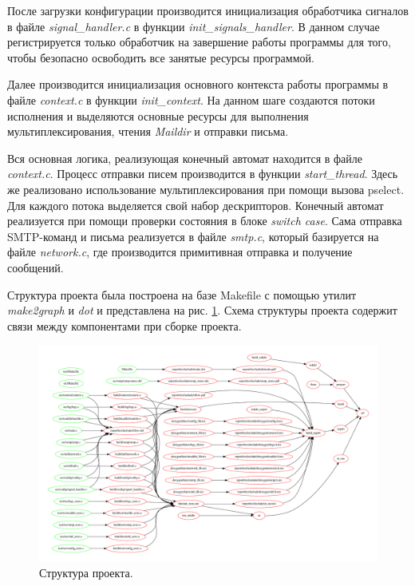 \documentclass[a4paper,12pt]{report}
\begin{document}
	После загрузки конфигурации производится инициализация обработчика сигналов в файле \textit{signal\_handler.c} в функции \textit{init\_signals\_handler}. В данном случае регистрируется только обработчик на завершение работы программы для того, чтобы безопасно освободить все занятые ресурсы программой.
	
	Далее производится инициализация основного контекста работы программы в файле \textit{context.c} в функции \textit{init\_context}. На данном шаге создаются потоки исполнения и выделяются основные ресурсы для выполнения мультиплексирования, чтения \textit{Maildir} и отправки письма.

	Вся основная логика, реализующая конечный автомат находится в файле \textit{context.c}. Процесс отправки писем производится в функции \textit{start_thread}. Здесь же реализовано использование мультиплексирования при помощи вызова pselect. Для каждого потока выделяется свой набор дескрипторов. Конечный автомат реализуется при помощи проверки состояния в блоке \textit{switch case}. Сама отправка SMTP-команд и письма реализуется в файле \textit{smtp.c}, который базируется на файле \textit{network.c}, где производится примитивная отправка и получение сообщений.

	Структура проекта была построена на базе Makefile с помощью утилит \textit{make2graph} и \textit{dot} и представлена на рис. \ref{fig:makeclient}. Схема структуры проекта содержит связи между компонентами при сборке проекта.

	\begin{figure}[H]
	\centering
	\includegraphics[width=\textwidth]{./include/make.pdf}
	\caption{Структура проекта.}
	\label{fig:makeclient}
	\end{figure}
\end{document}
